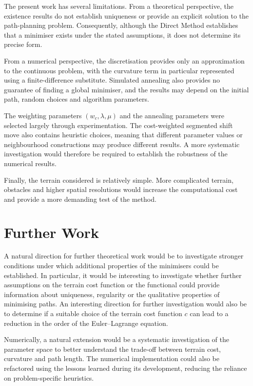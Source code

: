 The present work has several limitations. From a theoretical perspective, the existence results do not establish uniqueness or provide an explicit solution to the path-planning problem. Consequently, although the Direct Method establishes that a minimiser exists under the stated assumptions, it does not determine its precise form.

From a numerical perspective, the discretisation provides only an approximation to the continuous
problem, with the curvature term in particular represented using a
finite-difference substitute. Simulated annealing also provides no
guarantee of finding a global minimiser, and the results may depend on
the initial path, random choices and algorithm parameters.

The weighting parameters $(w_c,\lambda,\mu)$ and the annealing
parameters were selected largely through experimentation. The
cost-weighted segmented shift move also contains heuristic choices,
meaning that different parameter values or neighbourhood constructions
may produce different results. A more systematic investigation would
therefore be required to establish the robustness of the numerical
results.

Finally, the terrain considered is relatively simple. More complicated
terrain, obstacles and higher spatial resolutions would increase the
computational cost and provide a more demanding test of the method.

\section{Further Work}

A natural direction for further theoretical work would be to investigate stronger conditions under which additional properties of the minimisers could be established. In particular, it would be interesting to investigate whether further assumptions on the terrain cost function or the functional could provide information about uniqueness, regularity or the qualitative properties of minimising paths. An interesting direction for further investigation would also be to determine if a suitable choice of the terrain cost function $c$ can lead to a reduction in the order of the Euler--Lagrange equation.

Numerically, a natural extension would be a systematic investigation of the
parameter space to better understand the trade-off between terrain
cost, curvature and path length. The numerical implementation could
also be refactored using the lessons learned during its development,
reducing the reliance on problem-specific heuristics.

